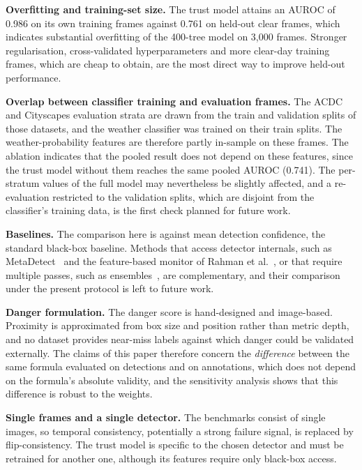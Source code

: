 \documentclass[pdflatex,sn-mathphys-num]{sn-jnl}
\begin{document}
\textbf{Overfitting and training-set size.} The trust model attains an AUROC of 0.986 on its own training frames against 0.761 on held-out clear frames, which indicates substantial overfitting of the 400-tree model on 3,000 frames. Stronger regularisation, cross-validated hyperparameters and more clear-day training frames, which are cheap to obtain, are the most direct way to improve held-out performance.

\textbf{Overlap between classifier training and evaluation frames.} The ACDC and Cityscapes evaluation strata are drawn from the train and validation splits of those datasets, and the weather classifier was trained on their train splits. The weather-probability features are therefore partly in-sample on these frames. The ablation indicates that the pooled result does not depend on these features, since the trust model without them reaches the same pooled AUROC (0.741). The per-stratum values of the full model may nevertheless be slightly affected, and a re-evaluation restricted to the validation splits, which are disjoint from the classifier's training data, is the first check planned for future work.

\textbf{Baselines.} The comparison here is against mean detection confidence, the standard black-box baseline. Methods that access detector internals, such as MetaDetect~\cite{schubert2021metadetect} and the feature-based monitor of Rahman et al.~\cite{rahman2021online}, or that require multiple passes, such as ensembles~\cite{lakshminarayanan2017ensembles}, are complementary, and their comparison under the present protocol is left to future work.

\textbf{Danger formulation.} The danger score is hand-designed and image-based. Proximity is approximated from box size and position rather than metric depth, and no dataset provides near-miss labels against which danger could be validated externally. The claims of this paper therefore concern the \emph{difference} between the same formula evaluated on detections and on annotations, which does not depend on the formula's absolute validity, and the sensitivity analysis shows that this difference is robust to the weights.

\textbf{Single frames and a single detector.} The benchmarks consist of single images, so temporal consistency, potentially a strong failure signal, is replaced by flip-consistency. The trust model is specific to the chosen detector and must be retrained for another one, although its features require only black-box access.
\end{document}

